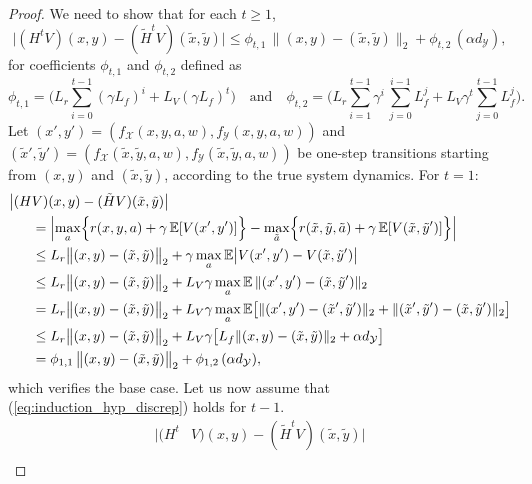 \documentclass[11pt, notitlepage]{article}
\newcommand{\E}{\mathbb{E}}
\newcommand{\1}{\mathbbm{1}}
\begin{document}
\begin{proof}
We need to show that for each $t \ge 1$,
\begin{equation}
    \bigl | (H^t V)(x,y) - (\tilde{H}^t V) (\tilde{x},\tilde{y}) \bigr | \le \phi_{t, 1} \, \bigl\|(x,y)-(\tilde{x}, \tilde{y}) \bigr \|_2 + \phi_{t, 2} \, (\alpha d_\mathcal{Y}),
    \label{eq:induction_hyp_discrep}
\end{equation}
for coefficients $\phi_{t,1}$ and $\phi_{t,2}$ defined as
\[
\phi_{t,1} = \biggl(L_r \sum_{i=0}^{t-1} (\gamma L_f)^i + L_V (\gamma L_f)^t\biggr) \quad \text{and} \quad \phi_{t,2} = \biggl( L_r \sum_{i=1}^{t-1} \gamma^i \, \sum_{j=0}^{i-1} L_f^j  + L_V \gamma^t \sum_{j=0}^{t-1} L_f^j \biggr).
\]
Let $(x', y') = (f_\mathcal{X}(x,y,a,w), f_\mathcal{Y}(x,y,a,w))$ and $(\tilde{x}', \tilde{y}') = (f_\mathcal{X}(\tilde{x},\tilde{y},a,w), f_\mathcal{Y}(\tilde{x},\tilde{y},a,w))$ be one-step transitions starting from $(x,y)$ and $(\tilde{x},\tilde{y})$, according to the true system dynamics. For $t=1$:
\begin{align*}
    \bigl | (H &V)(x,y) - (\tilde{H} V) (\tilde{x},\tilde{y}) \bigr |  \\
    &= \Bigl| \max_{a} \Bigl \{ r(x,y, a) + \gamma \, \E [V (x',y')] \Bigr \} - \max_{\tilde{a}} \Bigl \{ r(\tilde{x},\tilde{y},\tilde{a}) + \gamma \, \E [V (\tilde{x}, \tilde{y}')]\Bigr \} \Bigr| \nonumber\\
    &\le  L_r \bigl \|(x, y) - (\tilde{x}, \tilde{y}) \bigr\|_2 + \gamma \max_{a}  \mathbb{E} \bigl | V(x', y') - V(\tilde{x}, \tilde{y}')  \bigr|\\
    &\le L_r \bigl \|(x, y) - (\tilde{x}, \tilde{y}) \bigr\|_2 + L_V\gamma \max_{a}  \mathbb{E} \, \| (x', y') - (\tilde{x}, \tilde{y}')  \|_2 \\
    &= L_r \bigl \|(x, y) - (\tilde{x}, \tilde{y}) \bigr\|_2 + L_V\gamma \max_{a}  \mathbb{E} \bigl [  \| (x', y') - (\tilde{x}', \tilde{y}')\|_2 + \|(\tilde{x}', \tilde{y}')- (\tilde{x}, \tilde{y}') \|_2  \bigr]\\
    &\le L_r \bigl \|(x, y) - (\tilde{x}, \tilde{y}) \bigr\|_2 + L_V\gamma \bigl [  L_f \| (x, y) - (\tilde{x}, \tilde{y})\|_2 + \alpha d_\mathcal{Y}  \bigr]\\
    &=\phi_{1, 1} \, \bigl\|(x,y)-(\tilde{x}, \tilde{y}) \bigr \|_2 + \phi_{1, 2} \, (\alpha d_\mathcal{Y}),
\end{align*}
which verifies the base case. Let us now assume that (\ref{eq:induction_hyp_discrep}) holds for $t-1$.
\begin{align*}
    \bigl | (H^t &V)(x,y) - (\tilde{H}^t V) (\tilde{x},\tilde{y}) \bigr |  \\

\end{align*}
\end{proof}
\end{document}

